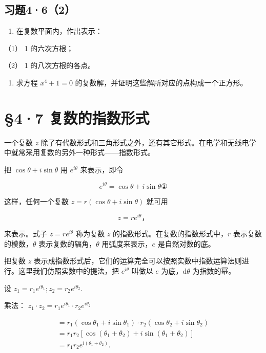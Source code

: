 \subsection{习题4·6（2）}

\begin{enumerate}
\item
  在复数平面内，作出表示：
\end{enumerate}

（1） 1 的六次方根；

（2） 1 的八次方根的各点。

\begin{enumerate}[start=2]
\item
  求方程 \(x^{4} + 1 = 0\)
  的复数解，并证明这些解所对应的点构成一个正方形。
\end{enumerate}

\section{§4·7 复数的指数形式}

一个复数 \(z\)
除了有代数形式和三角形式之外，还有其它形式。在电学和无线电学中就常采用复数的另外一种形式------指数形式。

把 \(\cos \theta + i\sin \theta\) 用 \(e^{i\theta}\) 来表示，即令

\[
e ^ {i \theta} = \cos \theta + i \sin \theta ①
\]

这样，任何一个复数 \(z = r(\cos \theta + i \sin \theta)\) 就可用

\[
z = r e ^ {i \theta}\text{，}
\]

来表示。式子 \(z = re^{i\theta}\) 称为复数 \(z\)
的指数形式。在复数的指数形式中，\(r\) 表示复数的模数，\(\theta\)
表示复数的辐角，\(\theta\) 用弧度来表示，\(e\) 是自然对数的底。

把复数 \(z\)
表示成指数形式后，它们的运算完全可以按照实数中指数运算法则进行。这里我们仿照实数中的提法，把
\(e^{i\theta}\) 叫做以 \(e\) 为底，\(\mathrm{d}\theta\) 为指数的幂。

设 \(z_{1} = r_{1}e^{i\theta_{1}}; z_{2} = r_{2}e^{i\theta_{2}}.\)

乘法：
\(z_{1}\cdot z_{2} = r_{1}e^{i\theta_{1}}\cdot r_{2}e^{i\theta_{2}}\)

\[
\begin{array}{l} = r _ {1} \left(\cos \theta_ {1} + i \sin \theta_ {1}\right) \cdot r _ {2} \left(\cos \theta_ {2} + i \sin \theta_ {2}\right) \\ = r _ {1} r _ {2} \left[ \cos \left(\theta_ {1} + \theta_ {2}\right) + i \sin \left(\theta_ {1} + \theta_ {2}\right) \right] \\ = r _ {1} r _ {2} e ^ {i \left(\theta_ {1} + \theta_ {2}\right)}. \\ \end{array}
\]

